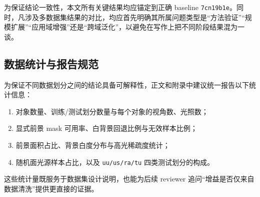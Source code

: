 \documentclass[UTF8,a4paper]{ctexart}
\begin{document}
为保证结论一致性，本文所有关键结果均应锚定到正确 baseline \texttt{7cn19b1e}。同时，凡涉及多数据集结果的对比，均应首先明确其所属问题类型是“方法验证”“规模扩展”“应用域增强”还是“跨域泛化”，以避免在写作上把不同阶段结果混为一谈。

\subsection{数据统计与报告规范}

为保证不同数据划分之间的结论具备可解释性，正文和附录中建议统一报告以下统计信息：

\begin{enumerate}
\item 对象数量、训练/测试划分数量与每个对象的视角数、光照数；
\item 显式前景 mask 可用率、白背景回退比例与无效样本比例；
\item 前景面积占比、背景白度分布与高光稀疏度统计；
\item 随机面光源样本占比，以及 \texttt{uu/us/ra/tu} 四类测试划分的构成。
\end{enumerate}

这些统计量既服务于数据集设计说明，也能为后续 reviewer 追问“增益是否仅来自数据清洗”提供更直接的证据。

\begin{table}[htbp]
\centering
\small
\setlength{\tabcolsep}{3.8pt}
\caption{新增子数据集的预处理统计与论文名义口径。``实际可训练'' 来自 \texttt{READY\_SUMMARY.json}；``名义口径'' 按当前 train/val 比例等比例外推到论文中使用的目标规模。}
\label{tab:dataset_preprocess_cn}
\end{table}
\end{document}
